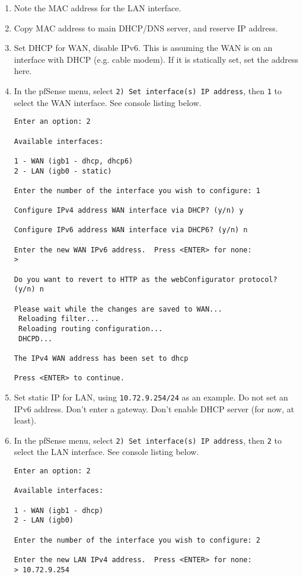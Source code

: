 \begin{enumerate}
 \item Note the MAC address for the LAN interface.
 \item Copy MAC address to main DHCP/DNS server, and reserve IP address.
 \item Set DHCP for WAN, disable IPv6. This is assuming the WAN is on an interface with DHCP (e.g. cable modem). If it is statically set, set
the address here.
 \item In the pfSense menu, select \texttt{2) Set interface(s) IP address}, then \texttt{1} to select the WAN interface. See console listing below.

\begin{verbatim}
Enter an option: 2

Available interfaces:

1 - WAN (igb1 - dhcp, dhcp6)
2 - LAN (igb0 - static)

Enter the number of the interface you wish to configure: 1

Configure IPv4 address WAN interface via DHCP? (y/n) y

Configure IPv6 address WAN interface via DHCP6? (y/n) n

Enter the new WAN IPv6 address.  Press <ENTER> for none:
> 

Do you want to revert to HTTP as the webConfigurator protocol? (y/n) n

Please wait while the changes are saved to WAN...
 Reloading filter...
 Reloading routing configuration...
 DHCPD...

The IPv4 WAN address has been set to dhcp

Press <ENTER> to continue.
\end{verbatim}

 \item Set static IP for LAN, using \texttt{10.72.9.254/24} as an example. Do not set an IPv6 address. Don't enter a gateway. Don't enable DHCP server (for now, at least).
 \item In the pfSense menu, select \texttt{2) Set interface(s) IP address}, then \texttt{2} to select the LAN interface. See console listing below.
\begin{verbatim}
Enter an option: 2

Available interfaces:

1 - WAN (igb1 - dhcp)
2 - LAN (igb0)

Enter the number of the interface you wish to configure: 2

Enter the new LAN IPv4 address.  Press <ENTER> for none:
> 10.72.9.254


\end{verbatim}
\end{enumerate}
